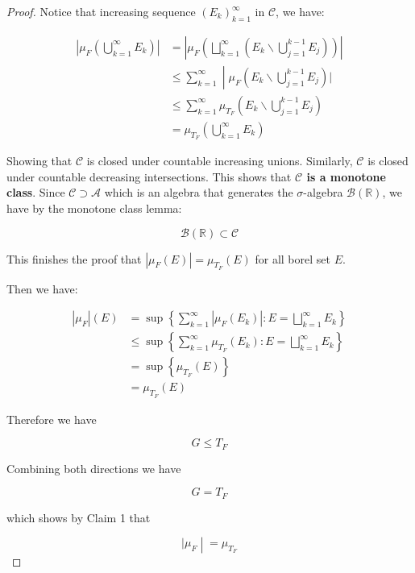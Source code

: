 \begin{proof}
Notice that increasing sequence \(\left( E_{k} \right)_{k = 1}^{\infty}\) in \(\mathcal{C}\), we have:

\[\begin{matrix}
\left| {\mu_{F}\left( {\bigcup\limits_{k = 1}^{\infty}E_{k}} \right)} \right| & {= \left| {\mu_{F}\left( {\bigsqcup\limits_{k = 1}^{\infty}(E_{k}\backslash\bigcup\limits_{j = 1}^{k - 1}E_{j})} \right)} \right|} \\
 & \left. \leq \sum\limits_{k = 1}^{\infty} \middle| \mu_{F}(E_{k}\backslash\bigcup\limits_{j = 1}^{k - 1}E_{j})| \right. \\
 & {\leq \sum\limits_{k = 1}^{\infty}\mu_{T_{F}}(E_{k}\backslash\bigcup\limits_{j = 1}^{k - 1}E_{j})} \\
 & {= \mu_{T_{F}}\left( {\bigcup\limits_{k = 1}^{\infty}E_{k}} \right)}
\end{matrix}\]

Showing that \(\mathcal{C}\) is closed under countable increasing unions. Similarly, \(\mathcal{C}\) is closed under countable decreasing intersections. This shows that \textbf{\(\mathcal{C}\) is a monotone class}. Since \(\mathcal{C} \supset \mathcal{A}\) which is an algebra that generates the \(\sigma\)-algebra \(\mathcal{B}(\mathbb{R})\), we have by the monotone class lemma:

\[\mathcal{B}(\mathbb{R}) \subset \mathcal{C}\]

This finishes the proof that \(\left| {\mu_{F}(E)} \right| = \mu_{T_{F}}(E)\) for all borel set \(E\).

Then we have:

\[\begin{matrix}
{\left| \mu_{F} \right|(E)} & {= \sup\left\{ {\sum\limits_{k = 1}^{\infty}\left| {\mu_{F}\left( E_{k} \right)} \right|:E = \bigsqcup\limits_{k = 1}^{\infty}E_{k}} \right\}} \\
 & {\leq \sup\left\{ {\sum\limits_{k = 1}^{\infty}\mu_{T_{F}}\left( E_{k} \right):E = \bigsqcup\limits_{k = 1}^{\infty}E_{k}} \right\}} \\
 & {= \sup\left\{ {\mu_{T_{F}}(E)} \right\}} \\
 & {= \mu_{T_{F}}(E)}
\end{matrix}\]

Therefore we have

\[G \leq T_{F}\]

Combining both directions we have

\[G = T_{F}\]

which shows by Claim 1 that

\[\left. |\mu_{F} \middle| = \mu_{T_{F}} \right.\]

\end{proof}


